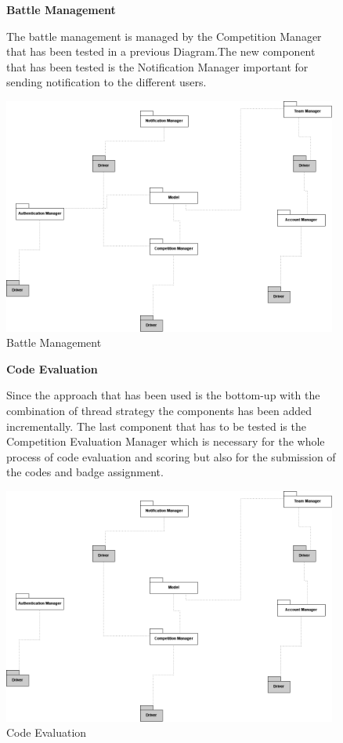 \begin{enumerate}[label={[\textbf{F\arabic*}]}]
\begin{figure}[!h]
    \end{figure}    

\begin{figure}[!h]
\item \textbf{Battle Management}

The battle management is managed by the Competition Manager that has been tested in a previous Diagram.The new component that has been tested is the Notification Manager important for sending notification to the different users.
         
    \centering
    \includegraphics[width=11cm]{Images/TestingBattleManagement.drawio(2).png}
    \caption{Battle Management}
    \label{fig:Battle Management}
\end{figure}




\begin{figure}[!h]
\item \textbf{Code Evaluation}

Since the approach that has been used is the bottom-up with the combination of thread strategy the components has been added incrementally. The last component that has to be tested is the Competition Evaluation Manager which is necessary for the whole process of code evaluation and scoring but also for the submission of the codes and badge assignment.
         
    \centering
    \includegraphics[width=11cm]{Images/TestingBattleManagement.drawio(1).png}
    \caption{Code Evaluation}
    \label{fig:Code Evaluation}
\end{figure}



\end{enumerate}
